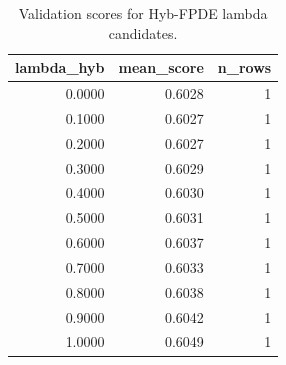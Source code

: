 \begin{table}[t]
\caption{Validation scores for Hyb-FPDE lambda candidates.}
\label{tab:lambda_distribution_computed}
\centering
\begin{tabular}{rrr}
\toprule
lambda\_hyb & mean\_score & n\_rows \\
\midrule
0.0000 & 0.6028 & 1 \\
0.1000 & 0.6027 & 1 \\
0.2000 & 0.6027 & 1 \\
0.3000 & 0.6029 & 1 \\
0.4000 & 0.6030 & 1 \\
0.5000 & 0.6031 & 1 \\
0.6000 & 0.6037 & 1 \\
0.7000 & 0.6033 & 1 \\
0.8000 & 0.6038 & 1 \\
0.9000 & 0.6042 & 1 \\
1.0000 & 0.6049 & 1 \\
\bottomrule
\end{tabular}

\end{table}
